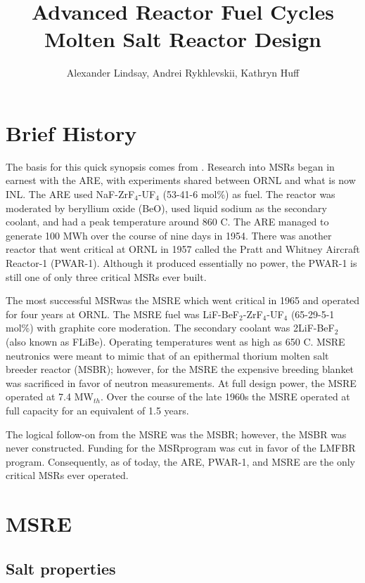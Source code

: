 \documentclass{article}
\title{Advanced Reactor Fuel Cycles Molten Salt Reactor Design}
\author{Alexander Lindsay, Andrei Rykhlevskii, Kathryn Huff} %
\let\Oldsection\section
\renewcommand{\section}{\FloatBarrier\Oldsection}
\let\Oldsubsection\subsection
\renewcommand{\subsection}{\FloatBarrier\Oldsubsection}
\begin{document}
\maketitle

\section{Brief History}

The basis for this quick synopsis comes from \cite{wikipedia_molten_2016}.
Research into \glspl{MSR} began in earnest with the \gls{ARE}, with experiments
shared between \gls{ORNL} and what is now \gls{INL}. The \gls{ARE} used
NaF-ZrF$_4$-UF$_4$ (53-41-6 mol\%) as fuel. The reactor was moderated by
beryllium oxide (BeO), used liquid sodium as the secondary coolant, and had a
peak temperature around 860 \textdegree C. The \gls{ARE} managed to generate
100 MWh over the course of nine days in 1954. There was another reactor that
went critical at \gls{ORNL} in 1957 called the Pratt and Whitney Aircraft Reactor-1
(PWAR-1). Although it produced essentially no power, the PWAR-1 is still one of
only three critical MSRs ever built.

The most successful \gls{MSR}was the \gls{MSRE} which went
critical in 1965 and operated for four years at \gls{ORNL}. The \gls{MSRE} fuel was
LiF-BeF$_2$-ZrF$_4$-UF$_4$ (65-29-5-1 mol\%) with graphite core moderation. The
secondary coolant was 2LiF-BeF$_2$ (also known as FLiBe). Operating temperatures
went as high as 650 \textdegree C. \gls{MSRE} neutronics were meant to mimic that of
an epithermal thorium molten salt breeder reactor (MSBR); however, for the \gls{MSRE}
the expensive breeding blanket was sacrificed in favor of neutron
measurements. At full design power, the \gls{MSRE} operated at 7.4 MW$_{th}$. Over the
course of the late 1960s the \gls{MSRE} operated at full capacity for an equivalent of
1.5 years.

The logical follow-on from the \gls{MSRE} was the MSBR; however, the MSBR was never
constructed. Funding for the \gls{MSR}program was cut in favor of the
\gls{LMFBR} program. Consequently, as of today, the \gls{ARE},
PWAR-1, and \gls{MSRE} are the only critical MSRs ever operated.

\section{\gls{MSRE}}

\subsection{Salt properties}
\end{document}
